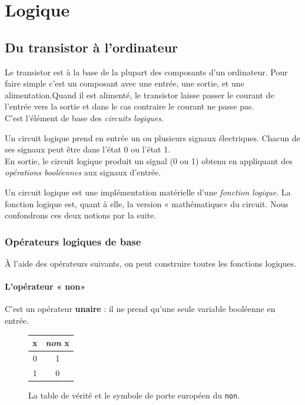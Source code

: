 \chapter{Logique}
\section{Du transistor à l'ordinateur}
Le transistor est à la base de la plupart des composants d'un ordinateur. Pour faire simple c'est un composant avec une entrée, une sortie, et une alimentation.Quand il est alimenté, le transistor laisse passer le courant de l'entrée vers la sortie et dans le cas contraire le courant ne passe pas.\\
C'est l'élément de base des \textit{circuits logiques}.
\begin{definition}
    Un circuit logique prend en entrée un ou plusieurs signaux électriques. Chacun de ses signaux peut être dans l'état 0 ou l'état 1.\\
    En sortie, le circuit logique produit un signal (0 ou 1) obtenu en appliquant des \textit{opérations booléennes} aux signaux d'entrée.
\end{definition}

Un circuit logique est une implémentation matérielle d'une \textit{fonction logique}. La fonction logique est, quant à elle, la version « mathématique»  du circuit. Nous confondrons ces deux notions par la suite.

\subsection{Opérateurs logiques de base}

À l'aide des opérateurs suivants, on peut construire toutes les fonctions logiques.

\subsubsection*{L'opérateur « non» }

C'est un opérateur \textbf{unaire} : il ne prend qu'une seule variable booléenne en entrée.
\tabularstyled
\begin{figure}[H]
    \begin{center}
        \begin{tabular}{|c|c|}
            \hline\rowcolor{UGLiOrange}
            {\boxfont\color{white}x} & {\boxfont\color{white}\textit{non} x} \\
            \hline
            0                        & 1                                     \\
            \hline
            1                        & 0                                     \\
            \hline
        \end{tabular}
        \hspace{3em}
    \end{center}
    \caption*{La table de vérité et le symbole de porte européen du \texttt{non}.}
\end{figure}



